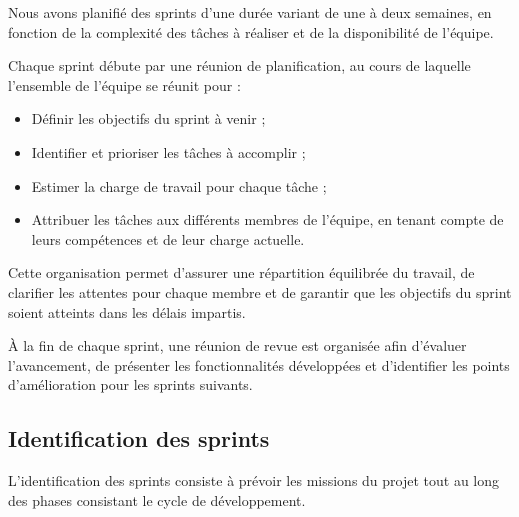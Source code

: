 Nous avons planifié des sprints d’une durée variant de une à deux semaines, en fonction de la complexité des tâches à réaliser et de la disponibilité de l’équipe.

Chaque sprint débute par une réunion de planification, au cours de laquelle l’ensemble de l’équipe se réunit pour :
\begin{itemize} [label=\textbullet]
    \item Définir les objectifs du sprint à venir ;
    \item Identifier et prioriser les tâches à accomplir ;
    \item Estimer la charge de travail pour chaque tâche ;
    \item Attribuer les tâches aux différents membres de l’équipe, en tenant compte de leurs compétences et de leur charge actuelle.
\end{itemize}

Cette organisation permet d’assurer une répartition équilibrée du travail, de clarifier les attentes pour chaque membre et de garantir que les objectifs du sprint soient atteints dans les délais impartis.

À la fin de chaque sprint, une réunion de revue est organisée afin d’évaluer l’avancement, de présenter les fonctionnalités développées et d’identifier les points d’amélioration pour les sprints suivants.


\subsection{Identification des sprints}
L’identification des sprints consiste à prévoir les missions du projet tout au long des phases consistant le cycle de développement.

